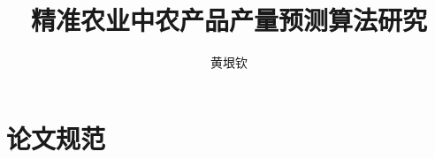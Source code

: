 \documentclass[bachelor]{swjtuthesis}
\title{精准农业中农产品产量预测算法研究}
\author{黄垠钦}
\begin{document}
\maketitle

%

\frontmatter

\tableofcontents
% 

\mainmatter

% 





\appendix
\chapter{论文规范}
\end{document}
